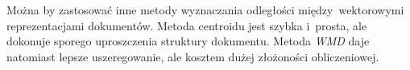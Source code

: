 \documentclass[pl]{minipw} %
\begin{document}
Można by zastosować inne metody wyznaczania odległości między~wektorowymi reprezentacjami dokumentów. Metoda centroidu jest szybka i~prosta, ale dokonuje sporego uproszczenia struktury dokumentu. Metoda \textit{WMD} daje natomiast lepsze uszeregowanie, ale kosztem dużej złożoności obliczeniowej.

\end{document}

